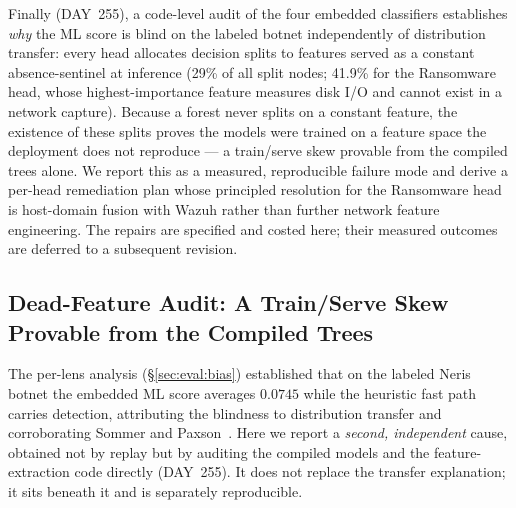 
Finally (DAY~255), a code-level audit of the four embedded classifiers
establishes \emph{why} the ML score is blind on the labeled botnet independently
of distribution transfer: every head allocates decision splits to features
served as a constant absence-sentinel at inference (29\% of all split nodes;
41.9\% for the Ransomware head, whose highest-importance feature measures disk
I/O and cannot exist in a network capture). Because a forest never splits on a
constant feature, the existence of these splits proves the models were trained
on a feature space the deployment does not reproduce --- a train/serve skew
provable from the compiled trees alone. We report this as a measured,
reproducible failure mode and derive a per-head remediation plan whose principled
resolution for the Ransomware head is host-domain fusion with Wazuh rather than
further network feature engineering. The repairs are specified and costed here;
their measured outcomes are deferred to a subsequent revision.



\subsection{Dead-Feature Audit: A Train/Serve Skew Provable from the Compiled Trees}
\label{sec:eval:deadfeatures}

The per-lens analysis (\S\ref{sec:eval:bias}) established that on the labeled
Neris botnet the embedded ML score averages $0.0745$ while the heuristic fast
path carries detection, attributing the blindness to distribution transfer and
corroborating Sommer and Paxson~\cite{sommer2010}. Here we report a
\emph{second, independent} cause, obtained not by replay but by auditing the
compiled models and the feature-extraction code directly (DAY~255). It does not
replace the transfer explanation; it sits beneath it and is separately
reproducible.

